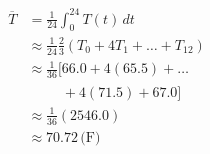 \documentclass[preview]{standalone}
\begin{document}
\begin{center}
\begin{align*}\overline{T} &= \frac{1}{24} \int_{0}^{24} T(t) \,dt \\&\approx \frac{1}{24} \frac{2}{3} \left( T_0 + 4T_1 + \dots + T_{12} \right) \\&\approx \frac{1}{36} \Big[ 66.0 + 4(65.5) + \dots \\&\phantom{\approx \frac{1}{36} \Big[} + 4(71.5) + 67.0 \Big] \\&\approx \frac{1}{36} (2546.0) \\&\approx 70.72 \, \text{(F)}\end{align*}
\end{center}
\end{document}
